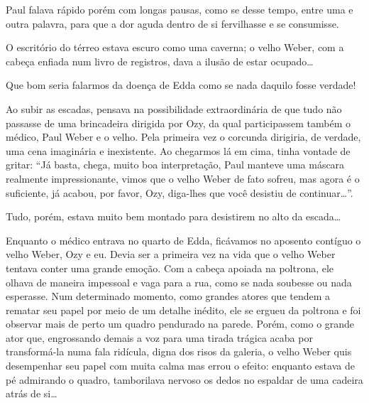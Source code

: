 
Paul falava rápido porém com longas pausas, como se desse tempo, entre uma e
outra palavra, para que a dor aguda dentro de si fervilhasse e se
consumisse.

O escritório do térreo estava escuro como uma caverna; o velho Weber, com a
cabeça enfiada num livro de registros, dava a ilusão de estar ocupado\ldots
{}



Que bom seria falarmos da doença de Edda como se nada daquilo fosse verdade!

Ao subir as escadas, pensava na possibilidade extraordinária de que tudo não
passasse de uma brincadeira dirigida por Ozy, da qual participassem também o
médico, Paul Weber e o velho. Pela primeira vez o corcunda dirigiria, de
verdade, uma cena imaginária e inexistente. Ao chegarmos lá em cima, tinha
vontade de gritar: ``Já basta, chega, muito boa interpretação, Paul manteve
uma máscara realmente impressionante, vimos que o velho Weber de fato sofreu,
mas agora é o suficiente, já acabou, por favor, Ozy, diga-lhes que você
desistiu de continuar\ldots{}''.

Tudo, porém, estava muito bem montado para desistirem no alto da escada\ldots
{}

Enquanto o médico entrava no quarto de Edda, ficávamos no aposento
 contíguo o velho Weber, Ozy e eu. Devia ser a primeira vez na vida que o
 velho Weber tentava conter uma grande emoção. Com a cabeça apoiada na
 poltrona, ele olhava de maneira impessoal e vaga para a rua, como se nada
 soubesse ou nada esperasse. Num determinado momento, como grandes atores que
 tendem a rematar seu papel por meio de um detalhe inédito, ele se ergueu da
 poltrona e foi observar mais de perto um quadro pendurado na parede. Porém,
 como o grande ator que, engrossando demais a voz para uma tirada trágica
 acaba por transformá-la numa fala ridícula, digna dos risos da galeria, o
 velho Weber quis desempenhar seu papel com muita calma mas errou o efeito:
 enquanto estava de pé admirando o quadro, tamborilava nervoso os dedos no
 espaldar de uma cadeira atrás de si\ldots{}

